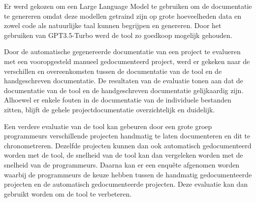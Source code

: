 Er werd gekozen om een Large Language Model te gebruiken om de documentatie te genereren omdat deze modellen getraind zijn op grote hoeveelheden data en zowel code als natuurlijke taal kunnen begrijpen en genereren.
Door het gebruiken van GPT3.5-Turbo werd de tool zo goedkoop mogelijk gehouden.

Door de automatische gegenereerde documentatie van een project te evalueren met een vooropgesteld manueel gedocumenteerd project, werd er gekeken naar de verschillen en overeenkomsten tussen de documentatie van de tool en de handgeschreven documentatie.
De resultaten van de evaluatie tonen aan dat de documentatie van de tool en de handgeschreven documentatie gelijkaardig zijn.
Alhoewel er enkele fouten in de documentatie van de individuele bestanden zitten, blijft de gehele projectdocumentatie overzichtelijk en duidelijk.

Een verdere evaluatie van de tool kan gebeuren door een grote groep programmeurs verschillende projecten handmatig te laten documenteren en dit te chronometreren. 
Dezelfde projecten kunnen dan ook automatisch gedocumenteerd worden met de tool, de snelheid van de tool kan dan vergeleken worden met de snelheid van de programmeurs.
Daarna kan er een enquête afgenomen worden waarbij de programmeurs de keuze hebben tussen de handmatig gedocumenteerde projecten en de automatisch gedocumenteerde projecten.
Deze evaluatie kan dan gebruikt worden om de tool te verbeteren.







